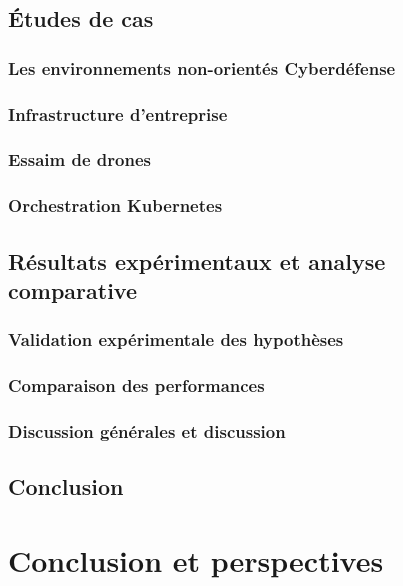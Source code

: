 \documentclass[ twoside,openright,titlepage,numbers=noenddot,headinclude,%
                footinclude=true,cleardoublepage=empty,abstractoff, %
                BCOR=5mm,paper=a4,fontsize=11pt,%
                french,american,%
                ]{scrreprt}
\begin{document}
\chapter{Études de cas}
\section{Les environnements non-orientés Cyberdéfense}
\section{Infrastructure d'entreprise}
\section{Essaim de drones}
\section{Orchestration Kubernetes}

\chapter{Résultats expérimentaux et analyse comparative}
\section{Validation expérimentale des hypothèses}
\section{Comparaison des performances}
\section{Discussion générales et discussion}

\chapter*{Conclusion}

\cleardoublepage
{}
{}
\part{Conclusion et perspectives}
\end{document}
